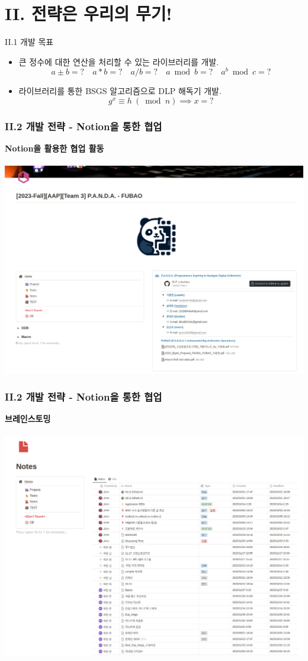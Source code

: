 \documentclass{beamer}
\begin{document}
\section{II. 전략은 우리의 무기!}
\begin{frame}{II.1 개발 목표}
	\begin{itemize}[<+->]
		\item 큰 정수에 대한 연산을 처리할 수 있는 라이브러리를 개발. \[
		a\pm b=?\quad a*b=?\quad a/b=?\quad a \bmod b=?\quad a^b\bmod{c}=?
		\]
		\item 라이브러리를 통한 BSGS 알고리즘으로 DLP 해독기 개발. \[
		g^x\equiv h\ (\bmod{n})\implies x=?
		\]
	\end{itemize}
\end{frame}
\begin{frame}
	\frametitle{II.2 개발 전략 - Notion을 통한 협업}
	\alert{\bf Notion을 활용한 협업 활동}\\
	\ \\
	\includegraphics[width=\linewidth,height=.825\textheight]{notion1.png}\\
\end{frame}
\begin{frame}
	\frametitle{II.2 개발 전략 - Notion을 통한 협업}
	\alert{\bf 브레인스토밍}\\
	\ \\
	\includegraphics[width=\linewidth,height=.825\textheight]{notion5.png}\\
\end{frame}
\end{document}
